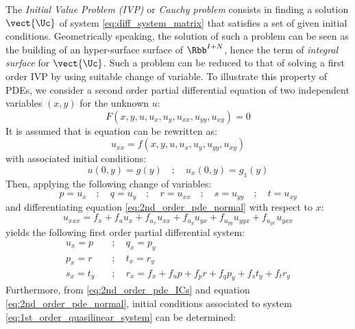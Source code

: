 The \textit{Initial Value Problem (IVP)} or \textit{Cauchy problem} consists in finding a solution $\vect{\Uc}$ of system \eqref{eq:diff_system_matrix} that satisfies a set of given initial conditions. Geometrically speaking, the solution of such a problem can be seen as the building of an hyper-surface surface of $\Rbb^{I+N}$, hence the term of \textit{integral surface} for $\vect{\Uc}$. Such a problem can be reduced to that of solving a first order IVP by using suitable change of variable. To illustrate this property of PDEs, we consider a second order partial differential equation of two independent variables $(x,y)$ for the unknown $u$:
\begin{equation}
  \label{eq:2nd_order_pde}
  F(x,y,u,u_x,u_y,u_{xx},u_{yy},u_{xy})=0
\end{equation}
It is assumed that is equation can be rewritten as:
\begin{equation}
  \label{eq:2nd_order_pde_normal}
  u_{xx}= f(x,y,u,u_x,u_y,u_{yy},u_{xy})
\end{equation}
with associated initial conditions:
\begin{equation}
  \label{eq:2nd_order_pde_ICs}
  u(0,y)= g(y) \quad ; \quad u_x(0,y)= g_1(y)
\end{equation}
Then, applying the following change of variables:
\begin{equation*}
  \label{eq:change_of_variables}
  p = u_x \quad  ; \quad   q = u_{y}  \quad   ; \quad    r = u_{xx} \quad   ; \quad  s = u_{yy} \quad;\quad   t = u_{xy} 
\end{equation*}
and differentiating equation \eqref{eq:2nd_order_pde_normal} with respect to $x$:
\begin{equation*}
  \label{eq:r_x}
  u_{xxx}= f_x + f_u u_x + f_{u_x}u_{xx} + f_{u_y}u_{yx} + f_{u_{yy}}u_{yyx}+f_{u_{yx}}u_{yxx}
\end{equation*}
yields the following first order partial differential system:
\begin{equation}
  \label{eq:1st_order_quasilinear_system}
  \begin{aligned}
    u_x  = p \quad & ; \quad    q_x  = p_y \\
    p_x  = r \quad &;\quad     t_x  = r_y \\
    s_x  = t_y \quad &;\quad   r_x  = f_x + f_up + f_p r + f_q p_y + f_s t_y + f_t r_y
  \end{aligned}
\end{equation}
Furthermore, from \eqref{eq:2nd_order_pde_ICs} and equation \eqref{eq:2nd_order_pde_normal}, initial conditions associated to system \eqref{eq:1st_order_quasilinear_system} can be determined:
